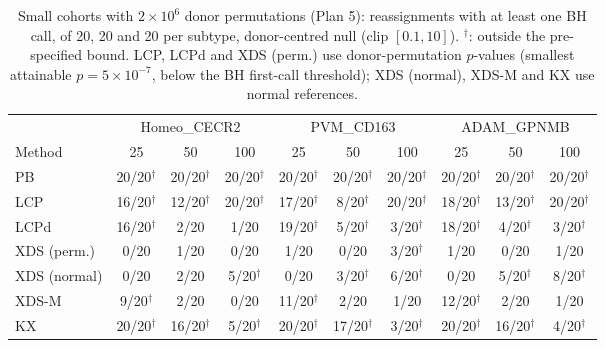 \begin{table}[h]\centering\small\setlength{\tabcolsep}{3pt}
\caption{Small cohorts with $2\times10^6$ donor permutations (Plan 5): reassignments with at least one BH call, of 20, 20 and 20 per subtype, donor-centred null (clip $[0.1,10]$). $^\dagger$: outside the pre-specified bound. LCP, LCPd and XDS (perm.) use donor-permutation $p$-values (smallest attainable $p=5\times10^{-7}$, below the BH first-call threshold); XDS (normal), XDS-M and KX use normal references.}\label{tab:R1}
\begin{tabular}{lccccccccc}\toprule & \multicolumn{3}{c}{Homeo\_CECR2} & \multicolumn{3}{c}{PVM\_CD163} & \multicolumn{3}{c}{ADAM\_GPNMB}\\
Method & 25 & 50 & 100 & 25 & 50 & 100 & 25 & 50 & 100\\\midrule
PB & 20/20$^\dagger$ & 20/20$^\dagger$ & 20/20$^\dagger$ & 20/20$^\dagger$ & 20/20$^\dagger$ & 20/20$^\dagger$ & 20/20$^\dagger$ & 20/20$^\dagger$ & 20/20$^\dagger$\\
LCP & 16/20$^\dagger$ & 12/20$^\dagger$ & 20/20$^\dagger$ & 17/20$^\dagger$ & 8/20$^\dagger$ & 20/20$^\dagger$ & 18/20$^\dagger$ & 13/20$^\dagger$ & 20/20$^\dagger$\\
LCPd & 16/20$^\dagger$ & 2/20 & 1/20 & 19/20$^\dagger$ & 5/20$^\dagger$ & 3/20$^\dagger$ & 18/20$^\dagger$ & 4/20$^\dagger$ & 3/20$^\dagger$\\
XDS (perm.) & 0/20 & 1/20 & 0/20 & 1/20 & 0/20 & 3/20$^\dagger$ & 1/20 & 0/20 & 1/20\\
XDS (normal) & 0/20 & 2/20 & 5/20$^\dagger$ & 0/20 & 3/20$^\dagger$ & 6/20$^\dagger$ & 0/20 & 5/20$^\dagger$ & 8/20$^\dagger$\\
XDS-M & 9/20$^\dagger$ & 2/20 & 0/20 & 11/20$^\dagger$ & 2/20 & 1/20 & 12/20$^\dagger$ & 2/20 & 1/20\\
KX & 20/20$^\dagger$ & 16/20$^\dagger$ & 5/20$^\dagger$ & 20/20$^\dagger$ & 17/20$^\dagger$ & 3/20$^\dagger$ & 20/20$^\dagger$ & 16/20$^\dagger$ & 4/20$^\dagger$\\
\bottomrule\end{tabular}\end{table}
